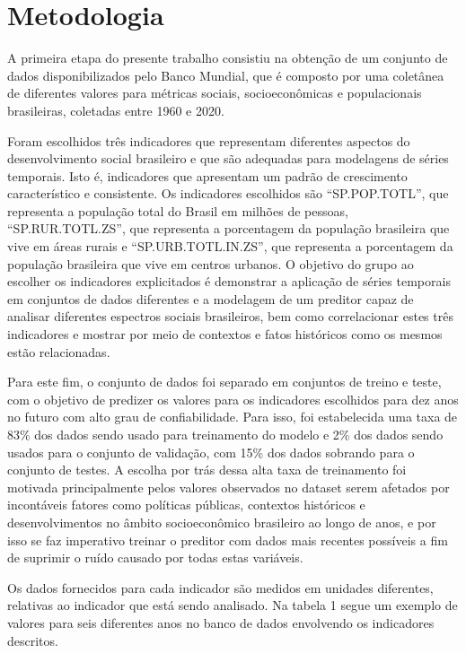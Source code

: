 \section{Metodologia}

A primeira etapa do presente trabalho consistiu na obtenção de um conjunto 
de dados disponibilizados pelo Banco Mundial, que é composto por uma 
coletânea de diferentes valores para métricas sociais, socioeconômicas 
e populacionais brasileiras, coletadas entre 1960 e 2020.

Foram escolhidos três indicadores que representam diferentes aspectos 
do desenvolvimento social brasileiro e que são adequadas para modelagens 
de séries temporais. Isto é, indicadores que apresentam um padrão de 
crescimento característico e consistente. Os indicadores escolhidos 
são “SP.POP.TOTL”, que representa a população total do Brasil em milhões 
de pessoas, “SP.RUR.TOTL.ZS”, que representa a porcentagem da população 
brasileira que vive em áreas rurais e “SP.URB.TOTL.IN.ZS”, que representa 
a porcentagem da população brasileira que vive em centros urbanos. 
O objetivo do grupo ao escolher os indicadores explicitados é 
demonstrar a aplicação de séries temporais em conjuntos de dados 
diferentes e a modelagem de um preditor capaz de analisar diferentes 
espectros sociais brasileiros, bem como correlacionar estes três 
indicadores e mostrar por meio de contextos e fatos históricos 
como os mesmos estão relacionadas.

Para este fim, o conjunto de dados foi separado em conjuntos de 
treino e teste, com o objetivo de predizer os valores para os 
indicadores escolhidos para dez anos no futuro com alto grau de 
confiabilidade. Para isso, foi estabelecida uma taxa de 83\% dos
dados sendo usado para treinamento do modelo e 2\% dos dados 
sendo usados para o conjunto de validação, com 15\% dos dados 
sobrando para o conjunto de testes. A escolha por trás dessa alta 
taxa de treinamento foi motivada principalmente pelos valores 
observados no dataset serem afetados por incontáveis fatores 
como políticas públicas, contextos históricos e desenvolvimentos 
no âmbito socioeconômico brasileiro ao longo de anos, e por 
isso se faz imperativo treinar o preditor com dados mais
recentes possíveis a fim de suprimir o ruído causado por todas 
estas variáveis. 


Os dados fornecidos para cada indicador são medidos em unidades 
diferentes, relativas ao indicador que está sendo analisado. 
Na tabela 1 segue um exemplo de valores para seis diferentes 
anos no banco de dados envolvendo os indicadores descritos.

